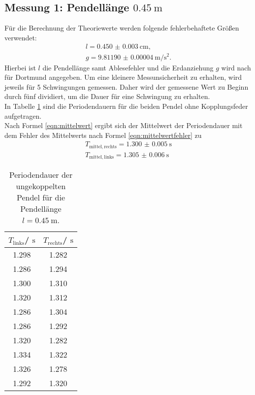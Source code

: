 \subsection{Messung 1: Pendellänge $\SI{0.45}{\meter}$}
\label{sec:erstens}
Für die Berechnung der Theoriewerte werden folgende fehlerbehaftete Größen verwendet:
\begin{gather*}
	l=\SI{0.450(3)}{\centi\meter} \text{,}\\
	g=\SI{9.81190(4)}{\meter\per\square\second} \text{.}
\end{gather*}
Hierbei ist $l$ die Pendellänge samt Ablesefehler und die Erdanziehung $g$ wird nach \cite{G} für Dortmund angegeben.
Um eine kleinere Messunsicherheit zu erhalten, wird jeweils für 5 Schwingungen gemessen. Daher wird der gemessene Wert zu Beginn durch fünf dividiert, um die Dauer für eine Schwingung zu erhalten.
\\In Tabelle \ref{tab:alinksrechts} sind die Periodendauern für die beiden Pendel ohne Kopplungsfeder aufgetragen.
\\Nach Formel \eqref{eqn:mittelwert} ergibt sich der Mittelwert der Periodendauer mit dem Fehler des Mittelwerts nach Formel \eqref{eqn:mittelwertfehler} zu
\begin{gather*}
	T_{\mathrm{mittel, rechts}}=\SI{1.300(5)}{\second}\\
	T_{\mathrm{mittel, links}}=\SI{1.305(6)}{\second}
\end{gather*}
\begin{table}
	\centering
	\caption{Periodendauer der ungekoppelten Pendel für die Pendellänge $l=\SI{0.45}{\meter}$.}
	\label{tab:alinksrechts}
	\begin{tabular}{cc}
		\toprule
		$T_{\mathrm{links}}$/ $\si{\second}$ & $T_{\mathrm{rechts}}$/ $\si{\second}$ \\
		\midrule
		1.298                                & 1.282                                 \\
		1.286                                & 1.294                                 \\
		1.300                                & 1.310                                 \\
		1.320                                & 1.312                                 \\
		1.286                                & 1.304                                 \\
		1.286                                & 1.292                                 \\
		1.320                                & 1.282                                 \\
		1.334                                & 1.322                                 \\
		1.326                                & 1.278                                 \\
		1.292                                & 1.320                                 \\
		\bottomrule
	\end{tabular}
\end{table}


